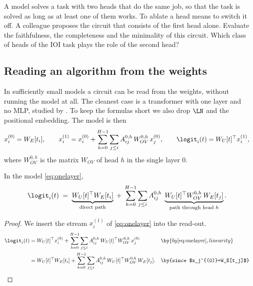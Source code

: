 \begin{exercise}\label{ex:redundant}
A model solves a task with two heads that do the same job, so that the task is solved as long as at least one of
them works. To ablate a head means to switch it off. A colleague proposes the circuit that consists of the first
head alone. Evaluate the faithfulness, the completeness and the minimality of this circuit. Which class of heads
of the IOI task plays the role of the second head?
\end{exercise}

\subsection{Reading an algorithm from the weights}
\label{sec:pathexp}

In sufficiently small models a circuit can be read from the weights, without running the model at all. The
cleanest case is a transformer with one layer and no MLP, studied by \citet{elhage2021mathematical}. To keep the
formulas short we also drop $\LN$ and the positional embedding. The model is then
\begin{equation}\label{eq:onelayer}
x_i^{(0)}=W_E[t_i],\qquad
x_i^{(1)}=x_i^{(0)}+\sum_{h=0}^{H-1}\sum_{j\le i}A^{0,h}_{ij}\,W_{OV}^{0,h}\,x_j^{(0)},\qquad
\logit_i(t)=W_U[t]^\top x_i^{(1)},
\end{equation}
where $W_{OV}^{0,h}$ is the matrix $W_{OV}$ of head $h$ in the single layer $0$.

\begin{proposition}\label{prop:path}
In the model \eqref{eq:onelayer},
\begin{equation}\label{eq:path}
\logit_i(t) \;=\; \underbrace{W_U[t]^\top W_E[t_i]}_{\text{direct path}}
\;+\;\sum_{h=0}^{H-1}\sum_{j\le i}A^{0,h}_{ij}\;\underbrace{W_U[t]^\top W_{OV}^{0,h}\,W_E[t_j]}_{\text{path through head }h} .
\end{equation}
\end{proposition}
\begin{proof}
We insert the stream $x_i^{(1)}$ of \eqref{eq:onelayer} into the read-out.
\begin{align*}
\logit_i(t) &= W_U[t]^\top x_i^{(0)}+\sum_{h=0}^{H-1}\sum_{j\le i}A^{0,h}_{ij}\,W_U[t]^\top W_{OV}^{0,h}\,x_j^{(0)}
&& \by{by \eqref{eq:onelayer}, linearity}\\
&= W_U[t]^\top W_E[t_i]+\sum_{h=0}^{H-1}\sum_{j\le i}A^{0,h}_{ij}\,W_U[t]^\top W_{OV}^{0,h}\,W_E[t_j].
&& \by{since $x_j^{(0)}=W_E[t_j]$}\qedhere
\end{align*}
\end{proof}

